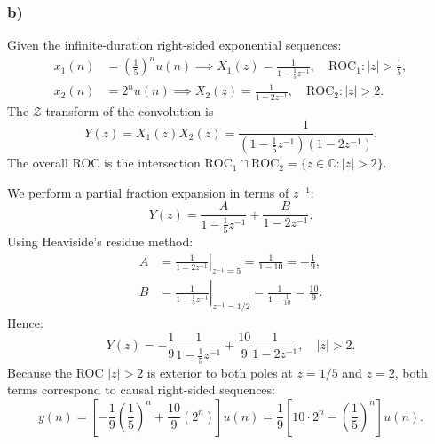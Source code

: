 \documentclass[12pt,a4paper]{article}
\begin{document}
\subsubsection*{b)}
Given the infinite-duration right-sided exponential sequences:
\begin{align*}
    x_1(n) &= \left(\frac{1}{5}\right)^n u(n) \implies X_1(z) = \frac{1}{1 - \frac{1}{5}z^{-1}}, \quad \text{ROC}_1: |z| > \frac{1}{5}, \\
    x_2(n) &= 2^n u(n) \implies X_2(z) = \frac{1}{1 - 2z^{-1}}, \quad \text{ROC}_2: |z| > 2.
\end{align*}
The $\mathcal{Z}$-transform of the convolution is
\begin{equation}
    Y(z) = X_1(z) X_2(z) = \frac{1}{\left(1 - \frac{1}{5}z^{-1}\right)(1 - 2z^{-1})}.
\end{equation}
The overall ROC is the intersection $\text{ROC}_1 \cap \text{ROC}_2 = \{z \in \mathbb{C} : |z| > 2\}$.

We perform a partial fraction expansion in terms of $z^{-1}$:
\begin{equation}
    Y(z) = \frac{A}{1 - \frac{1}{5}z^{-1}} + \frac{B}{1 - 2z^{-1}}.
\end{equation}
Using Heaviside's residue method:
\begin{align*}
    A &= \left. \frac{1}{1 - 2z^{-1}} \right|_{z^{-1} = 5} = \frac{1}{1 - 10} = -\frac{1}{9}, \\
    B &= \left. \frac{1}{1 - \frac{1}{5}z^{-1}} \right|_{z^{-1} = 1/2} = \frac{1}{1 - \frac{1}{10}} = \frac{10}{9}.
\end{align*}
Hence:
\begin{equation}
    Y(z) = -\frac{1}{9} \frac{1}{1 - \frac{1}{5}z^{-1}} + \frac{10}{9} \frac{1}{1 - 2z^{-1}}, \quad |z| > 2.
\end{equation}
Because the ROC $|z| > 2$ is exterior to both poles at $z = 1/5$ and $z = 2$, both terms correspond to causal right-sided sequences:
\begin{equation}
    y(n) = \left[ -\frac{1}{9}\left(\frac{1}{5}\right)^n + \frac{10}{9} (2^n) \right] u(n) = \frac{1}{9}\left[ 10 \cdot 2^n - \left(\frac{1}{5}\right)^n \right] u(n).
\end{equation}
\end{document}
